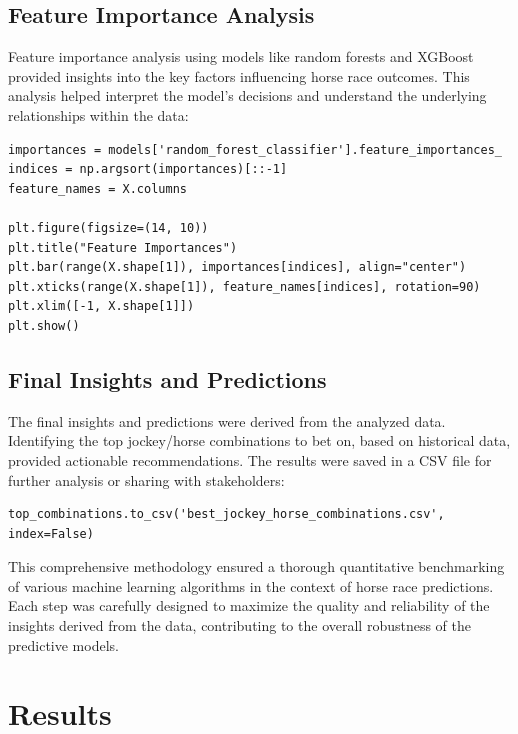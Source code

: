 \documentclass{article}
\begin{document}
\subsection*{Feature Importance Analysis}
Feature importance analysis using models like random forests and XGBoost provided insights into the key factors influencing horse race outcomes. This analysis helped interpret the model's decisions and understand the underlying relationships within the data:
\begin{verbatim}
importances = models['random_forest_classifier'].feature_importances_
indices = np.argsort(importances)[::-1]
feature_names = X.columns

plt.figure(figsize=(14, 10))
plt.title("Feature Importances")
plt.bar(range(X.shape[1]), importances[indices], align="center")
plt.xticks(range(X.shape[1]), feature_names[indices], rotation=90)
plt.xlim([-1, X.shape[1]])
plt.show()
\end{verbatim}

\subsection*{Final Insights and Predictions}
The final insights and predictions were derived from the analyzed data. Identifying the top jockey/horse combinations to bet on, based on historical data, provided actionable recommendations. The results were saved in a CSV file for further analysis or sharing with stakeholders:
\begin{verbatim}
top_combinations.to_csv('best_jockey_horse_combinations.csv', index=False)
\end{verbatim}

This comprehensive methodology ensured a thorough quantitative benchmarking of various machine learning algorithms in the context of horse race predictions. Each step was carefully designed to maximize the quality and reliability of the insights derived from the data, contributing to the overall robustness of the predictive models.

\section*{Results}
\end{document}
